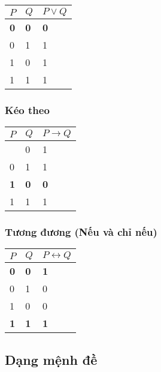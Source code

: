 \documentclass[11pt]{article}
\begin{document}
{\def\LTcaptype{none} %
\begin{longtable}[]{@{}lll@{}}
\toprule\noalign{}
\(P\) & \(Q\) & \(P \lor Q\) \\
\midrule\noalign{}
\endhead
\bottomrule\noalign{}
\endlastfoot
\textbf{0} & \textbf{0} & \textbf{0} \\
0 & 1 & 1 \\
1 & 0 & 1 \\
1 & 1 & 1 \\
\end{longtable}
}

\subsubsection{Kéo theo}\label{kuxe9o-theo}

{\def\LTcaptype{none} %
\begin{longtable}[]{@{}lll@{}}
\toprule\noalign{}
\(P\) & \(Q\) & \(P \to Q\) \\
\midrule\noalign{}
\endhead
\bottomrule\noalign{}
\endlastfoot
0 & 0 & 1 \\
0 & 1 & 1 \\
\textbf{1} & \textbf{0} & \textbf{0} \\
1 & 1 & 1 \\
\end{longtable}
}

\subsubsection{Tương đương (Nếu và chỉ
nếu)}\label{tux1b0ux1a1ng-ux111ux1b0ux1a1ng-nux1ebfu-vuxe0-chux1ec9-nux1ebfu}

{\def\LTcaptype{none} %
\begin{longtable}[]{@{}lll@{}}
\toprule\noalign{}
\(P\) & \(Q\) & \(P \leftrightarrow Q\) \\
\midrule\noalign{}
\endhead
\bottomrule\noalign{}
\endlastfoot
\textbf{0} & \textbf{0} & \textbf{1} \\
0 & 1 & 0 \\
1 & 0 & 0 \\
\textbf{1} & \textbf{1} & \textbf{1} \\
\end{longtable}
}

    \subsection{Dạng mệnh đề}\label{dux1ea1ng-mux1ec7nh-ux111ux1ec1}
\end{document}
